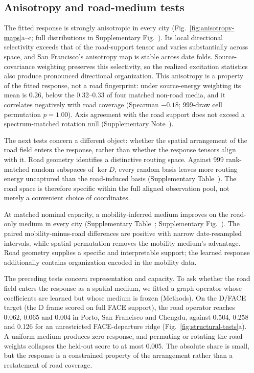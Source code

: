 \documentclass[11pt]{article}
\begin{document}
\subsection{Anisotropy and road-medium tests}\label{sec:structure}

The fitted response is strongly anisotropic in every city (Fig.~\ref{fig:anisotropy-maps}a--c; full distributions in Supplementary Fig.~). Its local directional selectivity exceeds that of the road-support tensor and varies substantially across space, and San Francisco's anisotropy map is stable across date folds. Source-covariance weighting preserves this selectivity, so the realized excitation statistics also produce pronounced directional organization. This anisotropy is a property of the fitted response, not a road fingerprint: under source-energy weighting its mean is 0.26, below the 0.32--0.33 of four matched non-road media, and it correlates negatively with road coverage (Spearman $-0.18$; 999-draw cell permutation $p=1.00$). Axis agreement with the road support does not exceed a spectrum-matched rotation null (Supplementary Note~).

The next tests concern a different object: whether the spatial arrangement of the road field enters the response, rather than whether the response tensors align with it. Road geometry identifies a distinctive routing space. Against 999 rank-matched random subspaces of $\ker D$, every random basis leaves more routing energy uncaptured than the road-induced basis (Supplementary Table~). The road space is therefore specific within the full aligned observation pool, not merely a convenient choice of coordinates.

At matched nominal capacity, a mobility-inferred medium improves on the road-only medium in every city (Supplementary Table~; Supplementary Fig.~). The paired mobility-minus-road differences are positive with narrow date-resampled intervals, while spatial permutation removes the mobility medium's advantage. Road geometry supplies a specific and interpretable support; the learned response additionally contains organization encoded in the mobility data.

The preceding tests concern representation and capacity. To ask whether the road field enters the response as a spatial medium, we fitted a graph operator whose coefficients are learned but whose medium is frozen (Methods). On the D/FACE target (the D frame scored on full FACE support), the road operator reaches 0.062, 0.065 and 0.004 in Porto, San Francisco and Chengdu, against 0.504, 0.258 and 0.126 for an unrestricted FACE-departure ridge (Fig.~\ref{fig:structural-tests}a). A uniform medium produces zero response, and permuting or rotating the road weights collapses the held-out score to at most 0.005. The absolute share is small, but the response is a constrained property of the arrangement rather than a restatement of road coverage.
\end{document}
